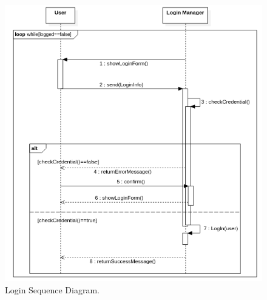 \documentclass{report}
\begin{document}
\newpage
\begin{figure}[ht!]
\begin{center}
\includegraphics[width=\textwidth]{./img/LoginSD.png}
\end{center}
\caption{Login Sequence Diagram.}
\label{fig:SequenceDiagram2}
\end{figure}
\newpage
\end{document}
